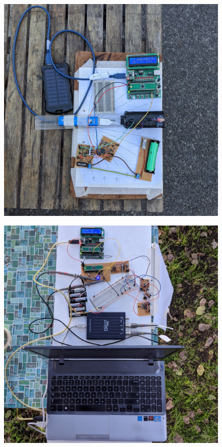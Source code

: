 \begin{figure}[H]
	\centering
	\begin{minipage}{.48\textwidth}
		\centering
		\includegraphics[width=.9\linewidth]{figures/experimentation/transmitter_setup_irl_crop.jpg}
		\label{fig:transmitter_setup_irl}
	\end{minipage}%
	\hfill
	\begin{minipage}{.48\textwidth}
		\centering
		\includegraphics[width=.9\linewidth]{figures/experimentation/receiver_setup_irl_crop.jpg}
		\label{fig:receiver_setup_irl}
	\end{minipage}
\end{figure}

